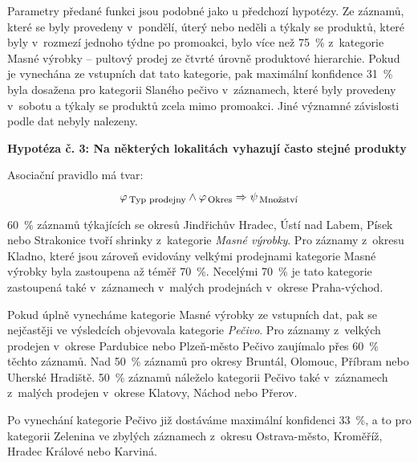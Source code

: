Parametry předané funkci jsou podobné jako u předchozí hypotézy. Ze záznamů, které se byly provedeny v~pondělí, úterý nebo neděli a týkaly se produktů, které byly v~rozmezí  jednoho týdne po promoakci, bylo více než 75~\% z~kategorie Masné výrobky -- pultový prodej ze čtvrté úrovně produktové hierarchie. Pokud je vynechána ze vstupních dat tato kategorie, pak maximální konfidence 31~\% byla dosažena pro kategorii Slaného pečivo v~záznamech, které byly provedeny v~sobotu a týkaly se produktů zcela mimo promoakci. Jiné významné závislosti podle dat nebyly nalezeny.

\vspace*{1em}

\textbf{Hypotéza č. 3: Na některých lokalitách vyhazují často stejné produkty}

Asociační pravidlo má tvar:
\begin{equation}
    \varphi_{\mbox{\,\footnotesize Typ prodejny}} \land \varphi_{\,\mbox{\footnotesize Okres}} \Rightarrow \psi_{\mbox{\,\footnotesize Množství}}
\end{equation}

60~\% záznamů týkajících se okresů Jindřichův Hradec, Ústí nad Labem, Písek nebo Strakonice tvoří shrinky z~kategorie \emph{Masné výrobky}. Pro záznamy z~okresu Kladno, které jsou zároveň evidovány velkými prodejnami kategorie Masné výrobky byla zastoupena až téměř 70~\%. Necelými 70~\% je tato kategorie zastoupená také v~záznamech v~malých prodejnách v~okrese Praha-východ.

Pokud úplně vynecháme kategorie Masné výrobky ze vstupních dat, pak se nejčastěji ve výsledcích objevovala kategorie \emph{Pečivo}. Pro záznamy z~velkých prodejen v~okrese Pardubice nebo Plzeň-město Pečivo zaujímalo přes 60~\% těchto záznamů. Nad 50~\% záznamů pro okresy Bruntál, Olomouc, Příbram nebo Uherské Hradiště. 50~\% záznamů náleželo kategorii Pečivo také v~záznamech z~malých prodejen v~okrese Klatovy, Náchod nebo Přerov.

Po vynechání kategorie Pečivo již dostáváme maximální konfidenci 33~\%, a to pro kategorii Zelenina ve zbylých záznamech z~okresu Ostrava-město, Kroměříž, Hradec Králové nebo Karviná.

\vspace*{1em}



